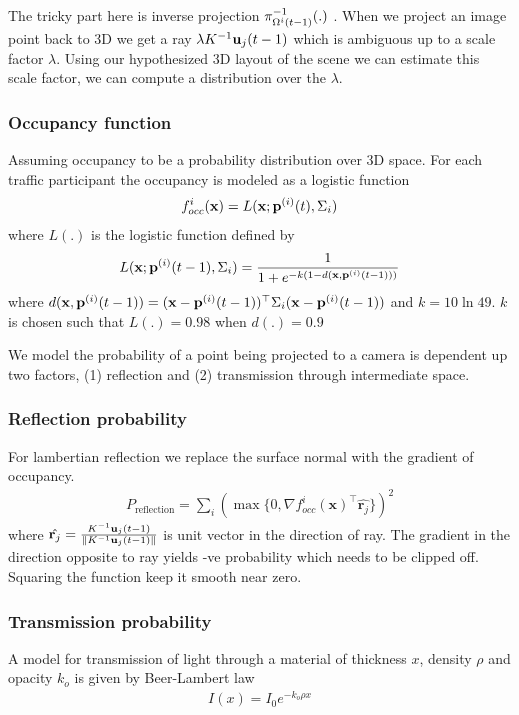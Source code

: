 \documentclass[10pt,twocolumn,letterpaper]{article}
\begin{document}
The tricky part here is inverse projection $\pi^{-1}_{\Omega^{i}(t-1)}(.)$ . When we
project an image point back to 3D we get a ray $\lambda K^{-1}\mathbf{u}_j(t-1)$
which is ambiguous up to a scale factor $\lambda$. Using our hypothesized 3D
layout of the scene we can estimate this scale factor, we
can compute a distribution over the $\lambda$. 
\subsubsection{Occupancy function}
Assuming occupancy to be a
probability distribution over 3D space. For each traffic participant the
occupancy is modeled as a logistic function 
\newcommand{\occf}{f^i_{occ}(\mathbf{x})}
\begin{align}
   \occf = L(\mathbf{x}; \pos{i}{t}, \Sigma_i)
\end{align}
where $L(.)$ is the logistic function defined by
\begin{align}
  L(\mathbf{x}; \mathbf{p}^{(i)}(t-1), \Sigma_i) = \frac{1}{
    1 + e^{-k(1 - d(\mathbf{x},\mathbf{p}^{(i)}(t-1)))}
    }
\end{align}
where $d(\mathbf{x},\mathbf{p}^{(i)}(t-1)) =
(\mathbf{x}-\mathbf{p}^{(i)}(t-1))^\top\Sigma_i(\mathbf{x}-\mathbf{p}^{(i)}(t-1))$ and $k =
10\ln{49}$. $k$ is chosen such that $L(.) = 0.98$ when $d(.) =
0.9$

We model the probability of a point being projected to a camera is dependent
up two factors, (1) reflection and (2) transmission through intermediate
space. 
\subsubsection{Reflection probability}
For lambertian reflection we replace the surface normal with the
gradient of occupancy.
\begin{align}
  P_{\text{reflection}} = \sum_i (\max \{0, \nabla \occf^\top
  \hat{\mathbf{r}_j}\})^2
\end{align}
where $\hat{\mathbf{r}_j} =
\frac{K^{-1}\mathbf{u}_j(t-1)}{\|K^{-1}\mathbf{u}_j(t-1)\|}$ is unit vector in the
direction of ray. The gradient in the direction opposite to ray yields -ve
probability which needs to be clipped off. Squaring the function keep it
smooth near zero.

\subsubsection{Transmission probability}
A model for transmission of light through a material of thickness $x$,
density $\rho$ and opacity $k_o$ is given by Beer-Lambert law 
\begin{align}
  I(x) = I_0e^{-k_o\rho x}
\end{align}
\end{document}
